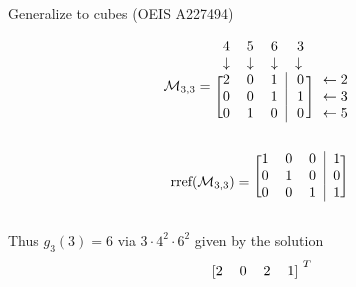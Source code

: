 \documentclass{beamer}
\begin{document}
\begin{frame}{Generalize to cubes (OEIS A227494)}

    \[
    \mathcal{M}_{3, 3} = %
    \begin{blockarray}{ccccc}
        4          & 5           & 6           & 3          \\
          \downarrow & \downarrow  & \downarrow  & \downarrow \\
    \begin{block}{[ccc|c]c}
        2 & 0 & 1 & 0 & \leftarrow 2 \\
        0 & 0 & 1 & 1 & \leftarrow 3 \\
        0 & 1 & 0 & 0 & \leftarrow 5 \\
    \end{block}
    \end{blockarray}
    \]

    \[
    \text{rref}(\mathcal{M}_{3, 3}) =
    \begin{blockarray}{cccc}
    \begin{block}{[ccc|c]}
        1 & 0 & 0 & 1 \\
        0 & 1 & 0 & 0 \\
        0 & 0 & 1 & 1 \\
    \end{block}
    \end{blockarray}
    \]

    Thus $g_3(3) = 6$ via $3 \cdot 4^2 \cdot 6^2$ given by the solution \[
      \begin{blockarray}{cccc}
      \begin{block}{[cccc]}
      2 & 0 & 2 & 1 \\
      \end{block}
      \end{blockarray}^T
    \]

\end{frame}
\end{document}
